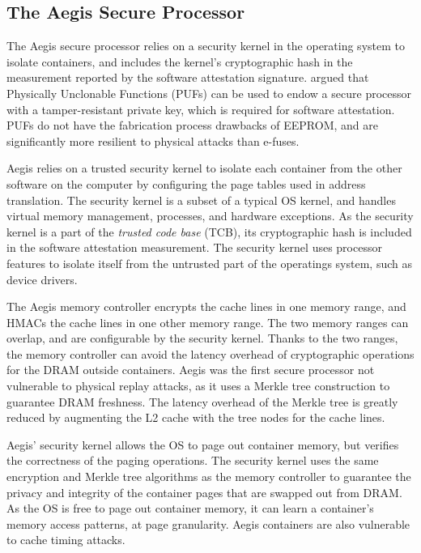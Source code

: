 \subsection{The Aegis Secure Processor}

The Aegis secure processor \cite{suh2003aegis} relies on a security kernel in the operating system to isolate containers, and includes the kernel's cryptographic hash in the measurement reported by the software attestation signature.  \cite{aegis_impl} argued that
Physically Unclonable Functions (PUFs) \cite{gassend2002puf} can be used to
endow a secure processor with a tamper-resistant private key, which is required
for software attestation. PUFs do not have the fabrication process drawbacks of
EEPROM, and are significantly more resilient to physical attacks than e-fuses.

Aegis relies on a trusted security kernel to isolate each container from the
other software on the computer by configuring the page tables used in address
translation. The security kernel is a subset of a typical OS kernel, and
handles virtual memory management, processes, and hardware exceptions. As the
security kernel is a part of the \textit{trusted code base} (TCB), its
cryptographic hash is included in the software attestation measurement. The
security kernel uses processor features to isolate itself from the untrusted
part of the operatings system, such as device drivers.

The Aegis memory controller encrypts the cache lines in one memory range, and
HMACs the cache lines in one other memory range. The two memory ranges can
overlap, and are configurable by the security kernel. Thanks to the two ranges,
the memory controller can avoid the latency overhead of cryptographic
operations for the DRAM outside containers. Aegis was the first secure processor not vulnerable to physical
replay attacks, as it uses a Merkle tree construction \cite{gassend2003merkle}
to guarantee DRAM freshness. The latency overhead of the Merkle tree is greatly
reduced by augmenting the L2 cache with the tree nodes for the cache lines.

Aegis' security kernel allows the OS to page out container memory, but verifies
the correctness of the paging operations. The security kernel uses the same
encryption and Merkle tree algorithms as the memory controller to guarantee the
privacy and integrity of the container pages that are swapped out from DRAM.
As the OS is free to page out container memory, it can learn a container's
memory access patterns, at page granularity. Aegis containers are also
vulnerable to cache timing attacks.
